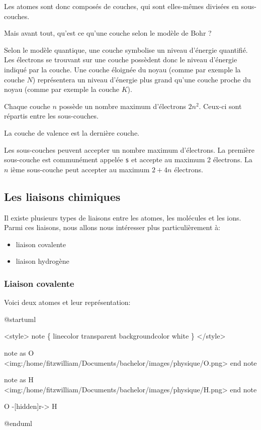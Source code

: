 \documentclass[
]{report}
\newenvironment{Shaded}{\begin{snugshade}}{\end{snugshade}}
\newcommand{\NormalTok}[1]{\textcolor[rgb]{0.00,0.23,0.31}{#1}}
\providecommand{\tightlist}{%
  \setlength{\itemsep}{0pt}\setlength{\parskip}{0pt}}\usepackage{longtable,booktabs,array}
\begin{document}
Les atomes sont donc composés de couches, qui sont elles-mêmes divisées
en sous-couches.

Mais avant tout, qu'est ce qu'une couche selon le modèle de Bohr ?

Selon le modèle quantique, une couche symbolise un niveau d'énergie
quantifié. Les électrons se trouvant sur une couche possèdent donc le
niveau d'énergie indiqué par la couche. Une couche éloignée du noyau
(comme par exemple la couche \(N\)) représentera un niveau d'énergie
plus grand qu'une couche proche du noyau (comme par exemple la couche
\(K\)).

Chaque couche \(n\) possède un nombre maximum d'électrons \(2n^2\).
Ceux-ci sont répartis entre les sous-couches.

La couche de valence est la dernière couche.

Les sous-couches peuvent accepter un nombre maximum d'électrons. La
première sous-couche est communément appelée \texttt{s} et accepte au
maximum 2 électrons. La \(n\) ième sous-couche peut accepter au maximum
\(2 + 4n\) électrons.

\subsection{Les liaisons chimiques}\label{les-liaisons-chimiques}

Il existe plusieurs types de liaisons entre les atomes, les molécules et
les ions. Parmi ces liaisons, nous allons nous intéresser plus
particulièrement à:

\begin{itemize}
\tightlist
\item
  liaison covalente
\item
  liaison hydrogène
\end{itemize}

\subsubsection{Liaison covalente}\label{liaison-covalente}

Voici deux atomes et leur représentation:

\begin{Shaded}
\begin{Highlighting}[]
\NormalTok{@startuml}

\NormalTok{\textless{}style\textgreater{}}
\NormalTok{note \{}
\NormalTok{    linecolor transparent}
\NormalTok{    backgroundcolor white}
\NormalTok{\}}
\NormalTok{\textless{}/style\textgreater{}}

\NormalTok{note as O}
\NormalTok{    \textless{}img:/home/fitzwilliam/Documents/bachelor/images/physique/O.png\textgreater{}}
\NormalTok{end note}

\NormalTok{note as H}
\NormalTok{    \textless{}img:/home/fitzwilliam/Documents/bachelor/images/physique/H.png\textgreater{}}
\NormalTok{end note}

\NormalTok{O {-}[hidden]r{-}\textgreater{} H}

\NormalTok{@enduml}
\end{Highlighting}
\end{Shaded}
\end{document}
